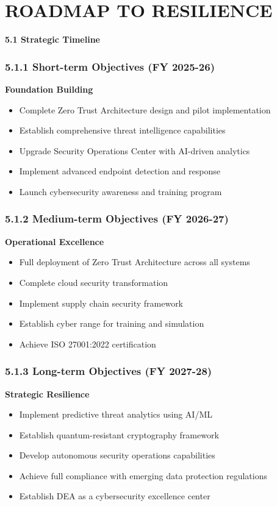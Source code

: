 \documentclass[12pt,a4paper]{report}
\newcommand{\sectionheader}[1]{\textbf{\color{govblue}#1}}
\newcommand{\roadmap}[1]{\textbf{\color{secred}#1}}
\begin{document}
\chapter{ROADMAP TO RESILIENCE}

\sectionheader{5.1 Strategic Timeline}

\subsection*{5.1.1 Short-term Objectives (FY 2025-26)}
\roadmap{Foundation Building}
\begin{itemize}[leftmargin=*, itemsep=3pt]
    \item Complete Zero Trust Architecture design and pilot implementation
    \item Establish comprehensive threat intelligence capabilities
    \item Upgrade Security Operations Center with AI-driven analytics
    \item Implement advanced endpoint detection and response
    \item Launch cybersecurity awareness and training program
\end{itemize}

\subsection*{5.1.2 Medium-term Objectives (FY 2026-27)}
\roadmap{Operational Excellence}
\begin{itemize}[leftmargin=*, itemsep=3pt]
    \item Full deployment of Zero Trust Architecture across all systems
    \item Complete cloud security transformation
    \item Implement supply chain security framework
    \item Establish cyber range for training and simulation
    \item Achieve ISO 27001:2022 certification
\end{itemize}

\subsection*{5.1.3 Long-term Objectives (FY 2027-28)}
\roadmap{Strategic Resilience}
\begin{itemize}[leftmargin=*, itemsep=3pt]
    \item Implement predictive threat analytics using AI/ML
    \item Establish quantum-resistant cryptography framework
    \item Develop autonomous security operations capabilities
    \item Achieve full compliance with emerging data protection regulations
    \item Establish DEA as a cybersecurity excellence center
\end{itemize}
\end{document}
